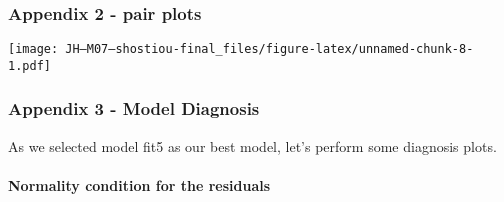 \documentclass[
]{article}
\newenvironment{Shaded}{\begin{snugshade}}{\end{snugshade}}
\newcommand{\CommentTok}[1]{\textcolor[rgb]{0.56,0.35,0.01}{\textit{#1}}}
\newcommand{\ControlFlowTok}[1]{\textcolor[rgb]{0.13,0.29,0.53}{\textbf{#1}}}
\newcommand{\DataTypeTok}[1]{\textcolor[rgb]{0.13,0.29,0.53}{#1}}
\newcommand{\DecValTok}[1]{\textcolor[rgb]{0.00,0.00,0.81}{#1}}
\newcommand{\FloatTok}[1]{\textcolor[rgb]{0.00,0.00,0.81}{#1}}
\newcommand{\KeywordTok}[1]{\textcolor[rgb]{0.13,0.29,0.53}{\textbf{#1}}}
\newcommand{\NormalTok}[1]{#1}
\newcommand{\OperatorTok}[1]{\textcolor[rgb]{0.81,0.36,0.00}{\textbf{#1}}}
\newcommand{\StringTok}[1]{\textcolor[rgb]{0.31,0.60,0.02}{#1}}
\begin{document}
\hypertarget{appendix-2---pair-plots}{%
\subsubsection{Appendix 2 - pair plots}\label{appendix-2---pair-plots}}

\begin{Shaded}
\end{Shaded}

\texttt{[image: JH---M07---shostiou-final\_files/figure-latex/unnamed-chunk-8-1.pdf]}

\hypertarget{appendix-3---model-diagnosis}{%
\subsubsection{Appendix 3 - Model
Diagnosis}\label{appendix-3---model-diagnosis}}

As we selected model fit5 as our best model, let's perform some
diagnosis plots.

\hypertarget{normality-condition-for-the-residuals}{%
\paragraph{Normality condition for the
residuals}\label{normality-condition-for-the-residuals}}

\begin{Shaded}
\end{Shaded}
\end{document}

